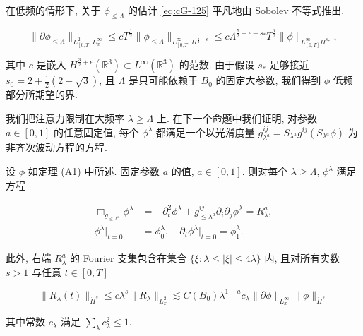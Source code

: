 \begin{remark*}[A2]
在低频的情形下, 关于 $\phi_{\leq \Lambda}$ 的估计 \eqref{eq:cG-125} 平凡地由 Sobolev 不等式推出. 

\[
\|\partial\phi_{\leq \Lambda}\|_{L_{[0, T]}^{2}L_{x}^{\infty}} \leq cT^{\frac{1}{2}}\|\phi_{\leq \Lambda}\|_{L_{[0, T]}^{\infty}H^{\frac{5}{2} + \epsilon}} \leq c\Lambda^{\frac{5}{2} + \epsilon - s_{*}}T^{\frac{1}{2}}\|\phi\|_{L_{[0, T]}^{\infty}H^{s_{*}}}, 
\]

其中 $c$ 是嵌入 $H^{\frac{3}{2} +\epsilon}(\mathbb{R}^3)\subset L^{\infty}(\mathbb{R}^{3})$ 的范数. 由于假设 $s_*$ 足够接近 $s_0 = 2 + \frac{1}{2}(2 - \sqrt{3})$, 且 $\Lambda$ 是只可能依赖于 $B_0$ 的固定大参数, 我们得到 $\phi$ 低频部分所期望的界. 
\end{remark*}

我们把注意力限制在大频率 $\lambda \geq \Lambda$ 上. 在下一个命题中我们证明, 对参数 $a \in [0, 1]$ 的任意固定值, 每个 $\phi^{\lambda}$ 都满足一个以光滑度量 $g_{\lambda^{a}}^{ij} = S_{\lambda^{a}}g^{ij}(S_{\lambda^{a}}\phi)$ 为非齐次波动方程的方程. 

\begin{proposition}\label{prop:cG-6.10}
设 $\phi$ 如定理 (A1) 中所述. 固定参数 $a$ 的值, $a \in [0, 1]$. 则对每个 $\lambda \geq \Lambda$, $\phi^{\lambda}$ 满足方程

\begin{equation}
\begin{aligned}
\Box_{g_{\leq\lambda^{a}}}\phi^{\lambda} &= -\partial_{t}^{2}\phi^{\lambda} + g_{\leq\lambda^{a}}^{ij}\partial_{i}\partial_{j}\phi^{\lambda} = R_{\lambda}^{a},  \\
\phi^{\lambda}|_{t = 0} &= \phi_{0}^{\lambda},  \quad \partial_{t}\phi^{\lambda}|_{t = 0} = \phi_{1}^{\lambda}.
\end{aligned}\label{eq:cG-126}
\end{equation}

此外, 右端 $R_{\lambda}^{a}$ 的 Fourier 支集包含在集合 $\{\xi : \lambda \leq |\xi| \leq 4\lambda\}$ 内, 且对所有实数 $s > 1$ 与任意 $t \in [0, T]$

\begin{equation}
\|R_{\lambda}(t)\|_{\dot{H}^{s}} \leq c\lambda^{s}\|R_{\lambda}\|_{L_{x}^{2}} \lesssim C(B_{0})\lambda^{1 - a}c_{\lambda}\|\partial\phi\|_{L_{x}^{\infty}}\|\phi\|_{\dot{H}^{s}}\label{eq:cG-127}
\end{equation}

其中常数 $c_{\lambda}$ 满足 $\sum_{\lambda} c_{\lambda}^{2} \leq 1$. 
\end{proposition}

